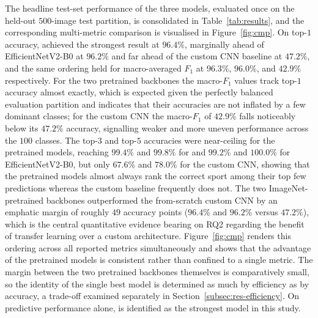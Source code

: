 The headline test-set performance of the three models, evaluated once on the held-out $500$-image test partition, is consolidated in Table~\ref{tab:results}, and the corresponding multi-metric comparison is visualised in Figure~\ref{fig:cmp}.
On top-$1$ accuracy, \bestModel{} achieved the strongest result at $96.4\%$, marginally ahead of EfficientNetV2-B0 at $96.2\%$ and far ahead of the custom CNN baseline at $47.2\%$, and the same ordering held for macro-averaged $F_1$ at $96.3\%$, $96.0\%$, and $42.9\%$ respectively.
For the two pretrained backbones the macro-$F_1$ values track top-$1$ accuracy almost exactly, which is expected given the perfectly balanced evaluation partition and indicates that their accuracies are not inflated by a few dominant classes; for the custom CNN the macro-$F_1$ of $42.9\%$ falls noticeably below its $47.2\%$ accuracy, signalling weaker and more uneven performance across the $100$ classes.
The top-$3$ and top-$5$ accuracies were near-ceiling for the pretrained models, reaching $99.4\%$ and $99.8\%$ for \bestModel{} and $99.2\%$ and $100.0\%$ for EfficientNetV2-B0, but only $67.6\%$ and $78.0\%$ for the custom CNN, showing that the pretrained models almost always rank the correct sport among their top few predictions whereas the custom baseline frequently does not.
The two ImageNet-pretrained backbones outperformed the from-scratch custom CNN by an emphatic margin of roughly $49$ accuracy points ($96.4\%$ and $96.2\%$ versus $47.2\%$), which is the central quantitative evidence bearing on RQ2 regarding the benefit of transfer learning over a custom architecture.
Figure~\ref{fig:cmp} renders this ordering across all reported metrics simultaneously and shows that the advantage of the pretrained models is consistent rather than confined to a single metric.
The margin between the two pretrained backbones themselves is comparatively small, so the identity of the single best model is determined as much by efficiency as by accuracy, a trade-off examined separately in Section~\ref{subsec:res-efficiency}.
On predictive performance alone, \bestModel{} is identified as the strongest model in this study.

